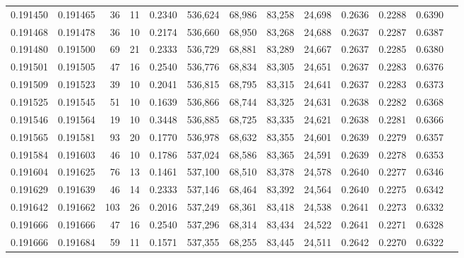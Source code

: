 \begin{tabular}{rrrrrrrrrrrrr}
0.191450 & 0.191465 &    36 &  11 &                                     0.2340 & 536,624 &  68,986 &  83,258 &  24,698 & 0.2636 & 0.2288 & 0.6390 \\
0.191468 & 0.191478 &    36 &  10 &                                     0.2174 & 536,660 &  68,950 &  83,268 &  24,688 & 0.2637 & 0.2287 & 0.6387 \\
0.191480 & 0.191500 &    69 &  21 &                                     0.2333 & 536,729 &  68,881 &  83,289 &  24,667 & 0.2637 & 0.2285 & 0.6380 \\
0.191501 & 0.191505 &    47 &  16 &                                     0.2540 & 536,776 &  68,834 &  83,305 &  24,651 & 0.2637 & 0.2283 & 0.6376 \\
0.191509 & 0.191523 &    39 &  10 &                                     0.2041 & 536,815 &  68,795 &  83,315 &  24,641 & 0.2637 & 0.2283 & 0.6373 \\
0.191525 & 0.191545 &    51 &  10 &                                     0.1639 & 536,866 &  68,744 &  83,325 &  24,631 & 0.2638 & 0.2282 & 0.6368 \\
0.191546 & 0.191564 &    19 &  10 &                                     0.3448 & 536,885 &  68,725 &  83,335 &  24,621 & 0.2638 & 0.2281 & 0.6366 \\
0.191565 & 0.191581 &    93 &  20 &                                     0.1770 & 536,978 &  68,632 &  83,355 &  24,601 & 0.2639 & 0.2279 & 0.6357 \\
0.191584 & 0.191603 &    46 &  10 &                                     0.1786 & 537,024 &  68,586 &  83,365 &  24,591 & 0.2639 & 0.2278 & 0.6353 \\
0.191604 & 0.191625 &    76 &  13 &                                     0.1461 & 537,100 &  68,510 &  83,378 &  24,578 & 0.2640 & 0.2277 & 0.6346 \\
0.191629 & 0.191639 &    46 &  14 &                                     0.2333 & 537,146 &  68,464 &  83,392 &  24,564 & 0.2640 & 0.2275 & 0.6342 \\
0.191642 & 0.191662 &   103 &  26 &                                     0.2016 & 537,249 &  68,361 &  83,418 &  24,538 & 0.2641 & 0.2273 & 0.6332 \\
0.191666 & 0.191666 &    47 &  16 &                                     0.2540 & 537,296 &  68,314 &  83,434 &  24,522 & 0.2641 & 0.2271 & 0.6328 \\
0.191666 & 0.191684 &    59 &  11 &                                     0.1571 & 537,355 &  68,255 &  83,445 &  24,511 & 0.2642 & 0.2270 & 0.6322 \\

\end{tabular}
